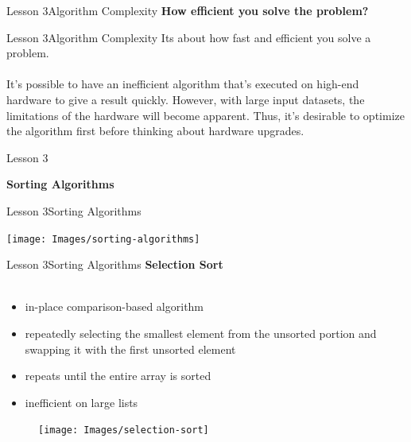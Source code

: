 \documentclass[aspectratio=1610]{beamer}
\begin{document}
\begin{frame}{Lesson 3}{Algorithm Complexity}
\huge
\textbf{How efficient you solve the problem?}
\end{frame}


\begin{frame}{Lesson 3}{Algorithm Complexity}
\LARGE
Its about how fast and efficient you solve a problem.\\~\\
\alert{It's possible to have an inefficient algorithm that's executed on high-end
hardware to give a result quickly. However, with large input datasets, the
limitations of the hardware will become apparent. Thus, it's desirable to 
optimize the algorithm first before thinking about hardware upgrades.}
\end{frame}





\begin{frame}{Lesson 3}{}
\begin{center}
\Huge \textbf{Sorting Algorithms}
\end{center}
\end{frame}




\begin{frame}{Lesson 3}{Sorting Algorithms}
\begin{center}
\texttt{[image: Images/sorting-algorithms]}
\end{center}
\end{frame}




\begin{frame}{Lesson 3}{Sorting Algorithms}
\LARGE
\textbf{Selection Sort}\\~\\
\begin{minipage}{0.65\textwidth}
\Large
\begin{itemize}
    \item in-place comparison-based algorithm
    \item repeatedly selecting the smallest element from the unsorted portion and swapping it with the first unsorted element
    \item repeats until the entire array is sorted
    \item inefficient on large lists
\end{itemize}
  \end{minipage}
\begin{minipage}{.0\textwidth}
      \begin{figure}
        \texttt{[image: Images/selection-sort]}
      \end{figure}
  \end{minipage}  
\end{frame}
\end{document}
